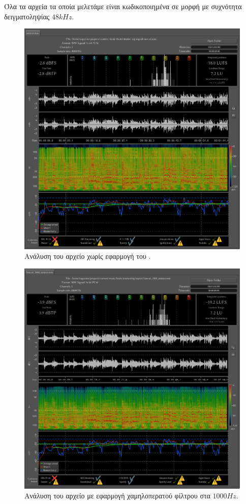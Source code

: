 \documentclass[12pt]{extarticle}
\begin{document}
Όλα τα αρχεία τα οποία μελετάμε είναι κωδικοποιημένα σε μορφή  με συχνότητα δειγματοληψίας $48kHz$.

\begin{figure}[htpb]
    \centering
    \includegraphics[width=\textwidth]{./assets/session.png}
    \caption{Ανάλυση του αρχείο  χωρίς εφαρμογή του .}
    \label{fig:sessionanalysis}
\end{figure}

\begin{figure}[htpb]
    \centering
    \includegraphics[width=\textwidth]{./assets/session_1000_lp.png}
    \caption{Ανάλυση του αρχείο  με εφαρμογή χαμηλοπερατού φίλτρου στα $1000Hz$.}
    \label{fig:sessionanalysislp1000}
\end{figure}
\end{document}
